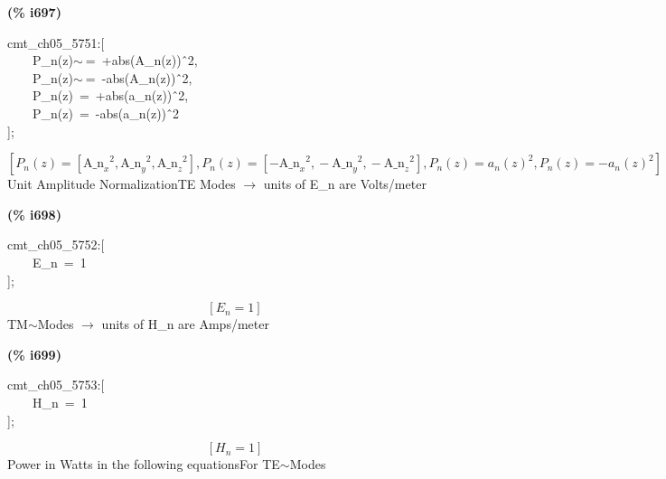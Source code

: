 \documentclass[fleqn]{article}
\begin{document}
\noindent
\begin{minipage}[t]{4.000000em}\color{red}\bfseries
(\% i697)	
\end{minipage}
\begin{minipage}[t]{\textwidth}\color{blue}
cmt\_ch05\_5751:[\\
\ \ \ \ P\_n(z)\ensuremath{\sim\ }=\ +abs(A\_n(z))\^\ 2,\ \\
\ \ \ \ P\_n(z)\ensuremath{\sim\ }=\ -abs(A\_n(z))\^\ 2,\ \\
\ \ \ \ P\_n(z)\ =\ +abs(a\_n(z))\^\ 2,\\
\ \ \ \ P\_n(z)\ =\ -abs(a\_n(z))\^\ 2\\
];
\end{minipage}
\[\displaystyle \tag{\% o697} 
\operatorname{[}{P_n}(z)=\left[ {{{{\ensuremath{\mathrm{A\_ n}}}_x}}^{2}}\operatorname{,}{{{{\ensuremath{\mathrm{A\_ n}}}_y}}^{2}}\operatorname{,}{{{{\ensuremath{\mathrm{A\_ n}}}_z}}^{2}}\right] \operatorname{,}{P_n}(z)=\left[ -{{{{\ensuremath{\mathrm{A\_ n}}}_x}}^{2}}\operatorname{,}-{{{{\ensuremath{\mathrm{A\_ n}}}_y}}^{2}}\operatorname{,}-{{{{\ensuremath{\mathrm{A\_ n}}}_z}}^{2}}\right] \operatorname{,}{P_n}(z)={{{a_n}(z)}^{2}}\operatorname{,
}{P_n}(z)=-{{{a_n}(z)}^{2}}\operatorname{]}\mbox{}
\]
Unit Amplitude NormalizationTE Modes \ensuremath{\longrightarrow} units of E\_n are Volts/meter


\noindent
\begin{minipage}[t]{4.000000em}\color{red}\bfseries
(\% i698)	
\end{minipage}
\begin{minipage}[t]{\textwidth}\color{blue}
cmt\_ch05\_5752:[\\
\ \ \ \ E\_n\ =\ 1\\
];
\end{minipage}
\[\displaystyle \tag{\% o698} 
\left[ {E_n}=1\right] \mbox{}
\]
TM\ensuremath{\sim }Modes \ensuremath{\longrightarrow} units of H\_n are Amps/meter


\noindent
\begin{minipage}[t]{4.000000em}\color{red}\bfseries
(\% i699)	
\end{minipage}
\begin{minipage}[t]{\textwidth}\color{blue}
cmt\_ch05\_5753:[\\
\ \ \ \ H\_n\ =\ 1\\
];
\end{minipage}
\[\displaystyle \tag{\% o699} 
\left[ {H_n}=1\right] \mbox{}
\]
Power in Watts in the following equationsFor TE\ensuremath{\sim }Modes
\end{document}
